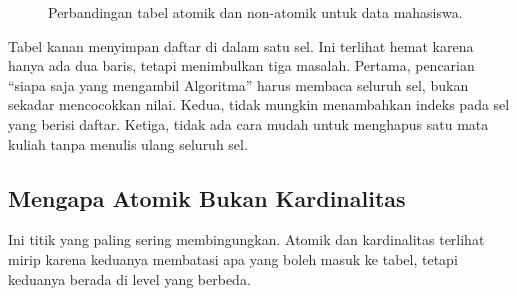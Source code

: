 \documentclass[11pt,a4paper]{article}
\begin{document}
\begin{figure}[H]
	\centering
	\caption{Perbandingan tabel atomik dan non-atomik untuk data mahasiswa.}
	\label{fig:atomic}
\end{figure}

Tabel kanan menyimpan daftar di dalam satu sel. Ini terlihat hemat karena hanya ada dua baris, tetapi menimbulkan tiga masalah. Pertama, pencarian ``siapa saja yang mengambil Algoritma'' harus membaca seluruh sel, bukan sekadar mencocokkan nilai. Kedua, tidak mungkin menambahkan indeks pada sel yang berisi daftar. Ketiga, tidak ada cara mudah untuk menghapus satu mata kuliah tanpa menulis ulang seluruh sel.

\subsection{Mengapa Atomik Bukan Kardinalitas}

Ini titik yang paling sering membingungkan. Atomik dan kardinalitas terlihat mirip karena keduanya membatasi apa yang boleh masuk ke tabel, tetapi keduanya berada di level yang berbeda.
\end{document}
